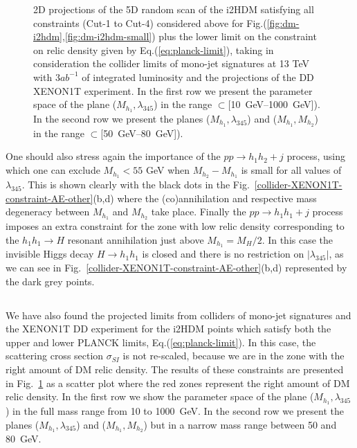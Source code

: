 \documentclass[12pt,a4paper]{article}
\providecommand{\DIFaddtex}[1]{{\protect\color{blue}\uwave{#1}}} %
\providecommand{\DIFaddbegin}{} %
\providecommand{\DIFaddend}{} %
\providecommand{\DIFadd}[1]{\texorpdfstring{\DIFaddtex{#1}}{#1}} %
\begin{document}
\begin{figure}[htb]
\caption{2D projections of the 5D random scan of the i2HDM satisfying all constraints (Cut-1 to Cut-4) considered above for Fig.(\ref{fig:dm-i2hdm},\ref{fig:dm-i2hdm-small}) plus the lower limit on the constraint on relic density given by Eq.(\ref{eq:planck-limit}), taking in consideration the collider limits of mono-jet signatures at 13 TeV with 3$ab^{-1}$ of integrated luminosity and the projections of the DD XENON1T experiment. In the first row we present the parameter space of the plane ($M_{h_1},\lambda_{345}$) in the range $\subset $[10~GeV--1000~GeV]). In the second row we present the planes ($M_{h_1},\lambda_{345}$) and ($M_{h_1},M_{h_2}$) in the range $ \subset $[50~GeV--80~GeV]).} \label{fig:dm-i2hdm-LHC-DD}
\end{figure}

One should also stress again the  importance of the   $pp \to h_1h_2+j$ process,
using which  one can exclude $M_{h_1}<55$ GeV when  $M_{h_2}-M_{h_1}$ is small
for all values of $\lambda_{345}$.
 This is shown clearly  with the black dots in the Fig.~\ref{collider-XENON1T-constraint-AE-other}(b,d) where the (co)annihilation and respective mass degeneracy between $M_{h_1}$ and $M_{h_2}$ take place. Finally the $pp \to h_1 h_1 + j$ process imposes an extra constraint for the zone with low relic density corresponding to the $h_1h_1 \to H$ resonant annihilation just above $M_{h_1}=M_H/2$. In this case the invisible Higgs decay $H \to h_1h_1$ is closed and there is no restriction on $|\lambda_{345}|$, as we can see in Fig.~\ref{collider-XENON1T-constraint-AE-other}(b,d) represented by the dark grey points.

\DIFaddbegin \subsection{\DIFadd{Fitting the PLANCK data: future projections}}

\DIFaddend We have also found the  projected limits from colliders of mono-jet signatures  and the XENON1T DD experiment for the i2HDM points which satisfy both the upper and lower PLANCK limits, Eq.(\ref{eq:planck-limit}). In this case, the scattering cross section $\sigma_{SI}$ is not re-scaled, because we are in the zone with the right amount of DM relic density. The results of these constraints are presented in Fig.~\ref{fig:dm-i2hdm-LHC-DD} as a scatter plot where the red zones represent the right amount of DM relic density. In the first row we show the parameter space of the plane ($M_{h_1},\lambda_{345}$) in the full
mass range from 10 to 1000~GeV. In the second row we present the planes ($M_{h_1},\lambda_{345}$) and ($M_{h_1},M_{h_2}$) but in a narrow mass range 
between 50 and 80~GeV.
%
\end{document}
